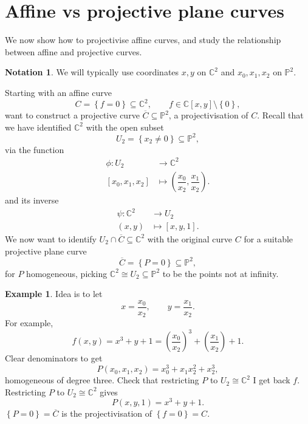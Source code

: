 \documentclass{article}
\newcommand{\C}{\mathbb{C}}
\renewcommand{\P}{\mathbb{P}}
\newcommand{\rb}[1]{\left( #1 \right)}
\renewcommand{\sb}[1]{\left[ #1 \right]}
\newcommand{\cb}[1]{\left\{ #1 \right\}}
\theoremstyle{definition}\newtheorem{definition}{Definition}[section]
\theoremstyle{definition}\newtheorem{notation}[definition]{Notation}
\theoremstyle{definition}\newtheorem{remark}[definition]{Remark}
\theoremstyle{definition}\newtheorem{example1}[definition]{Example}
\theoremstyle{definition}\newtheorem{fact}{Fact}
\theoremstyle{definition}\newtheorem{exercise}{Exercise}
\theoremstyle{definition}\newtheorem*{example2}{Example}
\begin{document}
\section{Affine vs projective plane curves}

We now show how to projectivise affine curves, and study the relationship between affine and projective curves.

\begin{notation}
We will typically use coordinates $ x, y $ on $ \C^2 $ and $ x_0, x_1, x_2 $ on $ \P^2 $.
\end{notation}

Starting with an affine curve
$$ C = \cb{f = 0} \subseteq \C^2, \qquad f \in \C\sb{x, y} \setminus \cb{0}, $$
want to construct a projective curve $ \overline{C} \subseteq \P^2 $, a projectivisation of $ C $. Recall that we have identified $ \C^2 $ with the open subset
$$ U_2 = \cb{x_2 \ne 0} \subseteq \P^2, $$
via the function
\begin{align*}
\phi : U_2 & \to \C^2 \\
\sb{x_0, x_1, x_2} & \mapsto \rb{\dfrac{x_0}{x_2}, \dfrac{x_1}{x_2}}.
\end{align*}
and its inverse
\begin{align*}
\psi : \C^2 & \to U_2 \\
\rb{x, y} & \mapsto \sb{x, y, 1}.
\end{align*}
We now want to identify $ U_2 \cap \overline{C} \subseteq \C^2 $ with the original curve $ C $ for a suitable projective plane curve
$$ \overline{C} = \cb{P = 0} \subseteq \P^2, $$
for $ P $ homogeneous, picking $ \C^2 \cong U_2 \subseteq \P^2 $ to be the points not at infinity.

\begin{example2}
Idea is to let
$$ x = \dfrac{x_0}{x_2}, \qquad y = \dfrac{x_1}{x_2}. $$
For example,
$$ f\rb{x, y} = x^3 + y + 1 = \rb{\dfrac{x_0}{x_2}}^3 + \rb{\dfrac{x_1}{x_2}} + 1. $$
Clear denominators to get
$$ P\rb{x_0, x_1, x_2} = x_0^3 + x_1x_2^2 + x_2^3, $$
homogeneous of degree three. Check that restricting $ P $ to $ U_2 \cong \C^2 $ I get back $ f $. Restricting $ P $ to $ U_2 \cong \C^2 $ gives
$$ P\rb{x, y, 1} = x^3 + y + 1. $$
$ \cb{P = 0} = \overline{C} $ is the projectivisation of $ \cb{f = 0} = C $.
\end{example2}
\end{document}
